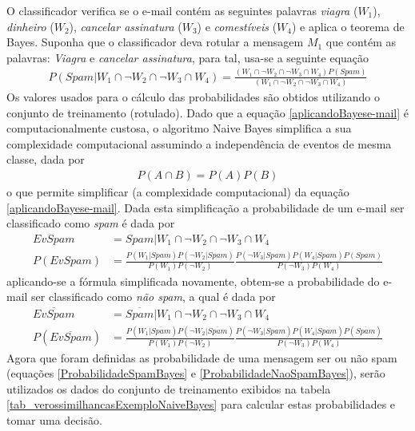 O classificador verifica se o e-mail contém as seguintes palavras \emph{viagra} (\(W_{1}\)), \emph{dinheiro} (\(W_{2}\)), \emph{cancelar assinatura} (\(W_{3}\)) e \emph{comestíveis} (\(W_{4}\)) e aplica o teorema de Bayes. Suponha que o classificador deva rotular a mensagem \(M_{1}\) que contém as palavras: \emph{Viagra} e \emph{cancelar assinatura}, para tal, usa-se a seguinte equação
\begin{align}
P(Spam|W_{1} \cap \neg W_{2} \cap \neg W_{3} \cap W_{4}) = \frac{(W_{1} \cap \neg W_{2} \cap \neg W_{3} \cap W_{4})P(Spam)}{(W_{1} \cap \neg W_{2} \cap \neg W_{3} \cap W_{4})} \label{aplicandoBayese-mail}
\end{align}
Os valores usados para o cálculo das probabilidades são obtidos utilizando o conjunto de treinamento (rotulado). Dado que a equação \eqref{aplicandoBayese-mail} é computacionalmente custosa, o algoritmo Naive Bayes simplifica a sua complexidade computacional assumindo a independência de eventos de mesma classe, dada por
\begin{align}
P(A \cap B) = P(A)P(B)
\end{align}
o que permite simplificar (a complexidade computacional) da equação \eqref{aplicandoBayese-mail}. Dada esta simplificação a probabilidade de um e-mail ser classificado como \emph{spam} é dada por
\begin{align}
EvSpam &= Spam|W_{1} \cap \neg W_{2} \cap \neg W_{3} \cap W_{4} \\
P(EvSpam) &= \frac{P(W_{1}|Spam) P(\neg W_{2}|Spam) }{P(W_{1}) P(\neg W_{2})} \frac{P(\neg W_{3}|Spam) P(W_{4}|Spam) P(Spam)}{P(\neg W_{3}) P(W_{4})} \label{ProbabilidadeSpamBayes}
\end{align}
aplicando-se a fórmula simplificada novamente, obtem-se a probabilidade do e-mail ser classificado como \emph{não spam}, a qual é dada por
\begin{align}
\overline{EvSpam} &= \overline{Spam}|W_{1} \cap \neg W_{2} \cap \neg W_{3} \cap W_{4} \\
P(\overline{EvSpam}) &= \frac{P(W_{1}|\overline{Spam}) P(\neg W_{2}|\overline{Spam}) }{P(W_{1})  P(\neg W_{2})} \frac{P(\neg W_{3}|\overline{Spam}) P(W_{4}|\overline{Spam}) P(\overline{Spam})}{P(\neg W_{3}) P(W_{4})} \label{ProbabilidadeNaoSpamBayes}
\end{align}
Agora que foram definidas as probabilidade de uma mensagem ser ou não spam (equações \eqref{ProbabilidadeSpamBayes} e \eqref{ProbabilidadeNaoSpamBayes}), serão utilizados os dados do conjunto de treinamento exibidos na tabela \ref{tab_verossimilhancasExemploNaiveBayes} para calcular estas probabilidades e tomar uma decisão.
